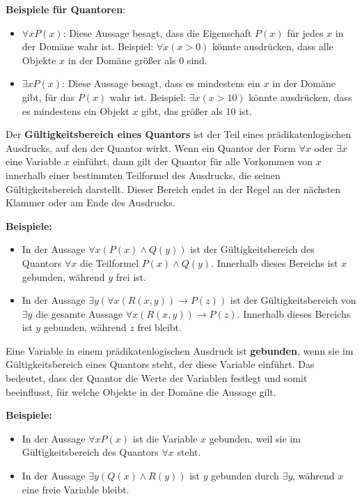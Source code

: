 \documentclass[main.tex]{subfiles}
\begin{document}
\textbf{Beispiele für Quantoren}:
\begin{itemize}
    \item \(\forall x P(x)\): Diese Aussage besagt, dass die Eigenschaft \(P(x)\) für jedes \(x\) in der Domäne wahr ist. Beispiel: \(\forall x (x > 0)\) könnte ausdrücken, dass alle Objekte \(x\) in der Domäne größer als 0 sind.
    \item \(\exists x P(x)\): Diese Aussage besagt, dass es mindestens ein \(x\) in der Domäne gibt, für das \(P(x)\) wahr ist. Beispiel: \(\exists x (x > 10)\) könnte ausdrücken, dass es mindestens ein Objekt \(x\) gibt, das größer als 10 ist.
\end{itemize}

\begin{definition}
Der \textbf{Gültigkeitsbereich eines Quantors} ist der Teil eines prädikatenlogischen Ausdrucks, auf den der Quantor wirkt. Wenn ein Quantor der Form \(\forall x\) oder \(\exists x\) eine Variable \(x\) einführt, dann gilt der Quantor für alle Vorkommen von \(x\) innerhalb einer bestimmten Teilformel des Ausdrucks, die seinen Gültigkeitsbereich darstellt. Dieser Bereich endet in der Regel an der nächsten Klammer oder am Ende des Ausdrucks.

\textbf{Beispiele:}
\begin{itemize}
    \item In der Aussage \(\forall x (P(x) \land Q(y))\) ist der Gültigkeitsbereich des Quantors \(\forall x\) die Teilformel \(P(x) \land Q(y)\). Innerhalb dieses Bereichs ist \(x\) gebunden, während \(y\) frei ist.
    \item In der Aussage \(\exists y (\forall x (R(x, y)) \rightarrow P(z))\) ist der Gültigkeitsbereich von \(\exists y\) die gesamte Aussage \(\forall x (R(x, y)) \rightarrow P(z)\). Innerhalb dieses Bereichs ist \(y\) gebunden, während \(z\) frei bleibt.
\end{itemize}
\end{definition}

\begin{definition}
Eine Variable in einem prädikatenlogischen Ausdruck ist \textbf{gebunden}, wenn sie im Gültigkeitsbereich eines Quantors steht, der diese Variable einführt. Das bedeutet, dass der Quantor die Werte der Variablen festlegt und somit beeinflusst, für welche Objekte in der Domäne die Aussage gilt.

\textbf{Beispiele:}
\begin{itemize}
    \item In der Aussage \(\forall x P(x)\) ist die Variable \(x\) gebunden, weil sie im Gültigkeitsbereich des Quantors \(\forall x\) steht.
    \item In der Aussage \(\exists y (Q(x) \land R(y))\) ist \(y\) gebunden durch \(\exists y\), während \(x\) eine freie Variable bleibt.
\end{itemize}
\end{definition}
\end{document}

